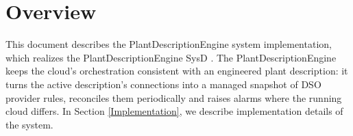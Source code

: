 \documentclass[a4paper]{arrowhead}
\begin{document}
\sloppy

\ArrowheadSetup

\begin{center}
  \vspace*{1cm}
  \huge{\arrowtitle}

  \vspace*{0.2cm}
  \LARGE{\arrowtype}
  \vspace*{1cm}

  \vspace*{\fill}


  \vspace*{1cm}
  \vspace*{\fill}

  \begin{abstract}
    This document describes the design and implementation of the PlantDescriptionEngine support system of Arrowhead 5.2.2 (\texttt{ah5-PlantDescriptionEngine-java-spring}).
  \end{abstract}

  \vspace*{1cm}
\end{center}

\newpage

\tableofcontents
\newpage

\section{Overview}
\label{sec:overview}

This document describes the PlantDescriptionEngine system implementation, which realizes the PlantDescriptionEngine SysD \cite{pde-sysd}. The Plant\allowbreak{}Description\allowbreak{}Engine keeps the cloud's orchestration consistent with an engineered plant description: it turns the active description's connections into a managed snapshot of DSO provider rules, reconciles them periodically and raises alarms where the running cloud differs.
In Section \ref{Implementation}, we describe implementation details of the system.
\end{document}
